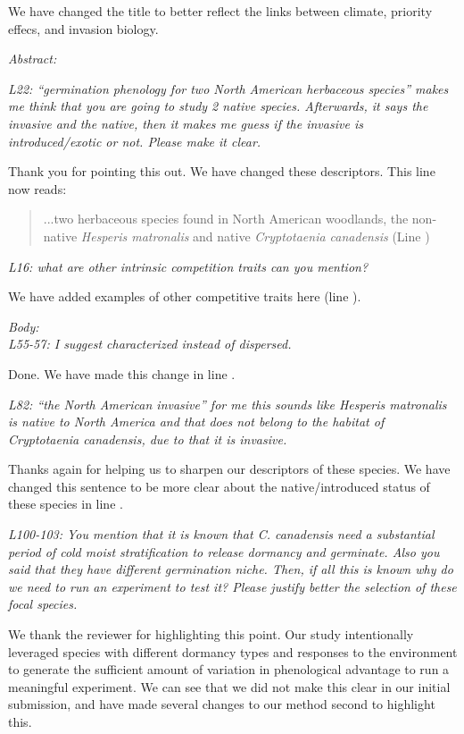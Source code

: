 \documentclass[11pt]{article}
\begin{document}
We have changed the title to  better reflect the links between climate, priority effecs, and invasion biology. 

\emph{ Abstract:} 

\emph{L22: “germination phenology for two North American herbaceous species” makes me think that you are going to study 2 native species. Afterwards, it says the invasive and the native, then it makes me guess if the invasive is introduced/exotic or not. Please make it clear.}

Thank you for pointing this out. We have changed these descriptors. This line now reads:
\begin{quote}...two herbaceous species found in North American woodlands, the non-native \textit{Hesperis matronalis} and native \textit{Cryptotaenia canadensis} (Line ) \end{quote}

\emph{L16: what are other intrinsic competition traits can you mention?}

We have added examples of other competitive traits here (line ). 

\emph{Body:}\\
\emph{L55-57: I suggest characterized instead of dispersed.}

Done. We have made this change in line .

\emph{L82: “the North American invasive” for me this sounds like Hesperis matronalis is native to North America and that does not belong to the habitat of Cryptotaenia canadensis, due to that it is invasive.}

Thanks again for helping us to sharpen our descriptors of these species. We have changed this sentence to be more clear about the native/introduced status of these species in line .

\emph{L100-103: You mention that it is known that C. canadensis need a substantial period of cold moist stratification to release dormancy and germinate. Also you said that they have different germination niche. Then, if all this is known why do we need to run an experiment to test it? Please justify better the selection of these focal species.}

We thank the reviewer for highlighting this point. Our study intentionally leveraged species with different dormancy types and responses to the environment to generate the sufficient amount of variation in phenological advantage to run a meaningful experiment. We can see that we did not make this clear in our initial submission, and have made several changes to our method second to highlight this.
\end{document}
